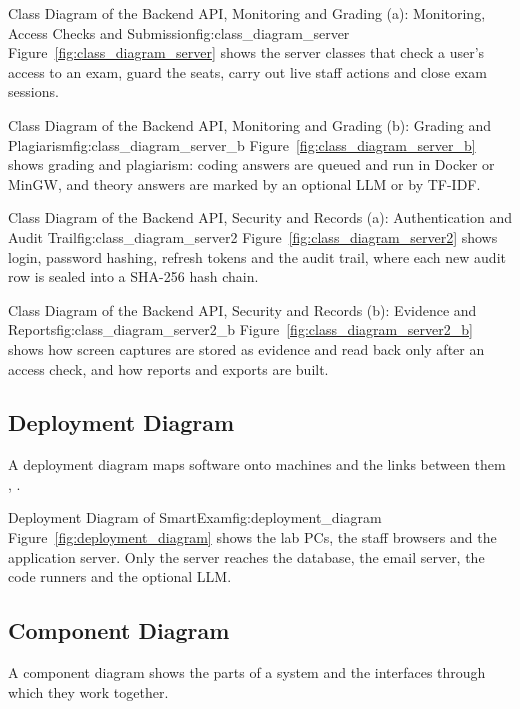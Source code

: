 %
{Class Diagram of the Backend API, Monitoring and Grading (a): Monitoring, Access Checks and Submission}{fig:class_diagram_server}%
{Figure~\ref{fig:class_diagram_server} shows the server classes that check a user's access to an exam, guard the seats, carry out live staff actions and close exam sessions.}

%
{Class Diagram of the Backend API, Monitoring and Grading (b): Grading and Plagiarism}{fig:class_diagram_server_b}%
{Figure~\ref{fig:class_diagram_server_b} shows grading and plagiarism: coding answers are queued and run in Docker or MinGW, and theory answers are marked by an optional LLM or by TF-IDF.}

%
{Class Diagram of the Backend API, Security and Records (a): Authentication and Audit Trail}{fig:class_diagram_server2}%
{Figure~\ref{fig:class_diagram_server2} shows login, password hashing, refresh tokens and the audit trail, where each new audit row is sealed into a SHA-256 hash chain.}

%
{Class Diagram of the Backend API, Security and Records (b): Evidence and Reports}{fig:class_diagram_server2_b}%
{Figure~\ref{fig:class_diagram_server2_b} shows how screen captures are stored as evidence and read back only after an access check, and how reports and exports are built.}

\subsection{Deployment Diagram}
A deployment diagram maps software onto machines and the links between them \cite[Cl.~19]{omg_uml251}, \cite{deployment_diagram_vp}.

%
{Deployment Diagram of SmartExam}{fig:deployment_diagram}%
{Figure~\ref{fig:deployment_diagram} shows the lab PCs, the staff browsers and the application server. Only the server reaches the database, the email server, the code runners and the optional LLM.}

\subsection{Component Diagram}
A component diagram shows the parts of a system and the interfaces through which they work together.

